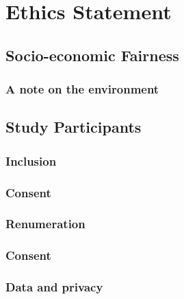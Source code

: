\section{Ethics Statement}\label{sec: polaris-ethics}
\subsection{Socio-economic Fairness}\label{sec: polaris-ethics-}
\subsubsection{A note on the environment}\label{sec: polaris-ethics-environment}

\subsection{Study Participants}\label{sec: polaris-ethics-participants}
\subsubsection{Inclusion}\label{sec: polaris-ethics-accessibility}
\subsubsection{Consent}\label{sec: polaris-ethics-inclusion}
\subsubsection{Renumeration}\label{sec: polaris-ethics-renumeration}
\subsubsection{Consent}\label{sec: polaris-ethics-consent}
\subsubsection{Data and privacy}\label{sec: polaris-ethics-data}
